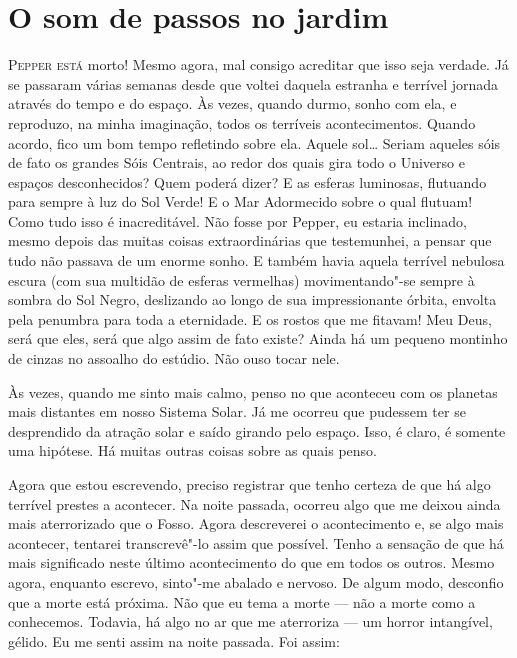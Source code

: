 \clearpage

\chapter{O som de passos no jardim}

\textsc{Pepper está} morto! Mesmo agora, mal consigo acreditar que isso seja verdade. Já se passaram várias semanas desde
que voltei daquela estranha e terrível jornada através do tempo e do espaço. Às vezes, quando durmo, sonho com ela, e
reproduzo, na minha imaginação, todos os terríveis acontecimentos. Quando acordo, fico um bom tempo refletindo sobre
ela. Aquele sol\ldots{} Seriam aqueles sóis de fato os grandes Sóis Centrais, ao redor dos quais gira todo o Universo e
espaços desconhecidos? Quem poderá dizer? E as esferas luminosas, flutuando para sempre à luz do Sol Verde! E o Mar
Adormecido sobre o qual flutuam! Como tudo isso é inacreditável. Não fosse por Pepper, eu estaria inclinado, mesmo
depois das muitas coisas extraordinárias que testemunhei, a pensar que tudo não passava de um enorme sonho. E também
havia aquela terrível nebulosa escura (com sua multidão de esferas vermelhas) movimentando"-se sempre à sombra do Sol
Negro, deslizando ao longo de sua impressionante órbita, envolta pela penumbra para toda a eternidade. E os rostos que
me fitavam! Meu Deus, será que eles, será que algo assim de fato existe? Ainda há um pequeno montinho de cinzas no
assoalho do estúdio. Não ouso tocar nele.

Às vezes, quando me sinto mais calmo, penso no que aconteceu com os planetas mais distantes em nosso Sistema Solar. Já
me ocorreu que pudessem ter se desprendido da atração solar e saído girando pelo espaço. Isso, é claro, é somente uma
hipótese. Há muitas outras coisas sobre as quais penso.

Agora que estou escrevendo, preciso registrar que tenho certeza de que há algo terrível prestes a acontecer. Na noite
passada, ocorreu algo que me deixou ainda mais aterrorizado que o Fosso. Agora descreverei o acontecimento e, se
algo mais acontecer, tentarei transcrevê"-lo assim que possível. Tenho a sensação de que há mais significado neste
último acontecimento do que em todos os outros. Mesmo agora, enquanto escrevo, sinto"-me abalado e nervoso. De algum
modo, desconfio que a morte está próxima. Não que eu tema a morte --- não a morte como a conhecemos. Todavia, há algo no
ar que me aterroriza --- um horror intangível, gélido. Eu me senti assim na noite passada. Foi assim:

